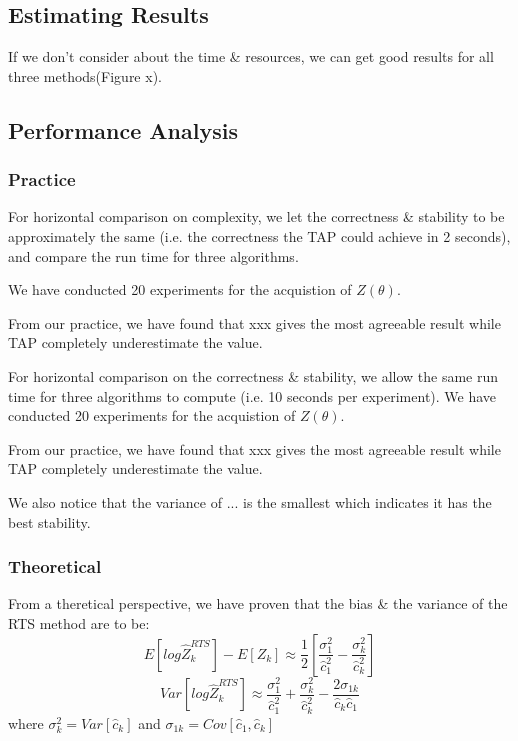 \subsection{Estimating Results}
If we don't consider about the time \& resources, we can get good results for all three methods(Figure x). 


\subsection{Performance Analysis}


\subsubsection{Practice}
For horizontal comparison on complexity, we let the correctness \& stability to be approximately the same (i.e. the correctness the TAP could achieve in 2 seconds), and compare the run time for three algorithms.

We have conducted 20 experiments for the acquistion of $Z(\theta)$.

From our practice, we have found that xxx gives the most agreeable result while TAP completely underestimate the value.


For horizontal comparison on the correctness \& stability, we allow the same run time for three algorithms to compute (i.e. 10 seconds per experiment). We have conducted 20 experiments for the acquistion of $Z(\theta)$.

From our practice, we have found that xxx gives the most agreeable result while TAP completely underestimate the value.

We also notice that the variance of ... is the smallest which indicates it has the best stability.



\subsubsection{Theoretical}
From a theretical perspective, we have proven that the bias \& the variance of the RTS method are to be:
\begin{equation}
E{[ log \hat{Z}_{k}^{RTS} ]} - E{[Z_{k}]} \approx \frac{1}{2}{[\frac{\sigma^{2}_{1}}{\hat{c}^{2}_{1}}-\frac{\sigma^{2}_{k}}{\hat{c}^{2}_{k}}]} 
\end{equation}
\begin{equation}
Var{[ log \hat{Z}_{k}^{RTS} ]} \approx \frac{\sigma^{2}_{1}}{\hat{c}^{2}_{1}} + \frac{\sigma^{2}_{k}}{\hat{c}^{2}_{k}} - \frac{2\sigma_{1k}}{\hat{c}_{k}\hat{c}_{1}}
\end{equation}
where $\sigma^{2}_{k} = Var{[\hat{c}_{k}]}$ and $\sigma_{1k} = Cov{[\hat{c}_{1},\hat{c}_{k}]}$

